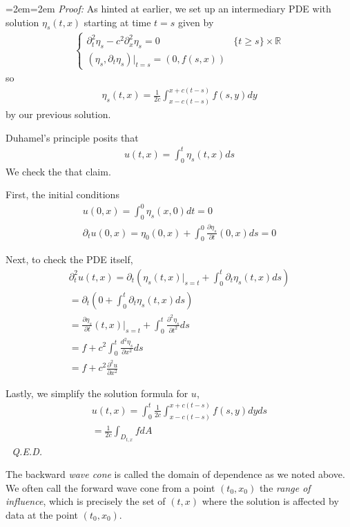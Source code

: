 \documentclass{article}
\newcommand{\R}{{\mathbb{R}}}
\newcommand{\pd}{\partial}
\newenvironment{pf}{%
	\par%
	\medskip
	\leftskip=2em\rightskip=2em%
	\noindent\ignorespaces \textit{Proof:} \newline}{%
	\,\, \newline \textit{Q.E.D.}\par\medskip}
\begin{document}
	
	\begin{pf}
		As hinted at earlier, we set up an intermediary PDE with solution $\eta_{s}(t,x)$ starting at time $t=s$ given by 
		\begin{align*}
			\begin{cases}
				\pd_{t}^{2}\eta_{s} - c^2 \pd_{x}^{2}\eta_{s} = 0 & \{t \geq s\} \times \R \\
				(\eta_s, \pd_{t}\eta_s) |_{t=s} = (0,f(s,x))
			\end{cases}
		\end{align*}
		so 
		\begin{align*}
			\eta_{s}(t,x) = \frac{1}{2c} \int_{x-c(t-s)}^{x+c(t-s)} f(s,y) dy
		\end{align*}
		by our previous solution. 
		
		Duhamel's principle posits that 
		\begin{align*}
			u(t,x) = \int_{0}^{t} \eta_{s}(t,x) ds
		\end{align*}
		We check the that claim. 
		
		First, the initial conditions 
		\begin{align*}
			u(0,x) = \int_{0}^{0} \eta_{s}(x,0)dt = 0 \\
			\pd_{t} u(0,x) = \eta_{0}(0,x) + \int_{0}^{0} \frac{\pd \eta_s}{\pd t}(0,x) ds =0 
		\end{align*}
		
		Next, to check the PDE itself,
		\begin{align*}
			\pd_{t}^{2} u(t,x) = \pd_{t}( \eta_{s}(t,x)|_{s=t} + \int_{0}^{t} \pd_{t} \eta_{s} (t,x)ds ) \\
			= \pd_{t} ( 0+\int_{0}^{t} \pd_{t} \eta_{s} (t,x)ds) \\
			= \frac{\pd \eta_{s}}{\pd t} (t,x)|_{s=t} + \int_{0}^{t} \frac{\pd^{2} \eta_{s}}{\pd t^{2}}ds \\
			= f + c^{2} \int_{0}^{t} \frac{d^{2} \eta_{s}}{\pd x^{2}} ds \\
			= f + c^{2} \frac{\pd^{2} u}{\pd x^{2}}	
		\end{align*}
		
		
		Lastly, we simplify the solution formula for $u$,
		\begin{align*}
			u(t,x) = \int_{0}^{t} \frac{1}{2c} \int_{x-c(t-s)}^{x+c(t-s)} f(s,y) dy ds \\ 
			= \frac{1}{2c} \int_{D_{t,x}} f dA
		\end{align*}
	\end{pf}
	
	The backward \textit{wave cone} is called the domain of dependence as we noted above. We often call the forward wave cone from a point $(t_0,x_0)$ the \textit{range of influence}, which is precisely the set of $(t,x)$ where the solution is affected by data at the point $(t_0,x_0)$. 
	
\end{document}

